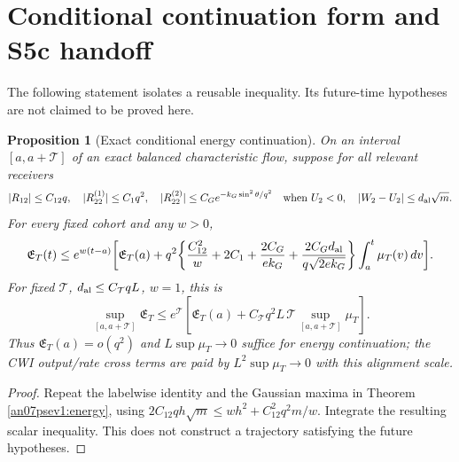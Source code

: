 \documentclass[11pt]{article}
\numberwithin{equation}{section}
\newtheorem{proposition}[theorem]{Proposition}
\theoremstyle{remark}\newtheorem{remark}[theorem]{Remark}
\newcommand{\EE}{\mathfrak E}
\begin{document}
\section{Conditional continuation form and S5c handoff}
\label{an07psev1:continuation}
The following statement isolates a reusable inequality. Its
future-time hypotheses are not claimed to be proved here.
\begin{proposition}[Exact conditional energy continuation]
\label{an07psev1:conditional}
On an interval \([a,a+\mathcal T]\) of an exact balanced characteristic
flow, suppose for all relevant receivers
\[
 |R_{12}|\le C_{12}q,\quad |R_{22}^{(1)}|\le C_1q^2,\quad
 |R_{22}^{(2)}|\le C_Ge^{-k_G\sin^2\theta/q^2}
                         \quad\text{when }U_2<0,
 \quad |W_2-U_2|\le d_{\rm al}\sqrt m .
 \]
For every fixed cohort and any \(w>0\),
\begin{align}
 \EE_T(t)\le e^{w(t-a)}\bigg[\EE_T(a)
 +q^2\bigg\{\frac{C_{12}^2}{w}+2C_1
 +\frac{2C_G}{e k_G}
 +\frac{2C_Gd_{\rm al}}{q\sqrt{2e k_G}}\bigg\}
 \int_a^t\mu_T(v)\dd v\bigg].
 \label{an07psev1:conditionalbound}
\end{align}
For fixed \(\mathcal T\), \(d_{\rm al}\le C_{\mathcal T}qL\),
\(w=1\), this is
\[
 \sup_{[a,a+\mathcal T]}\EE_T
 \le e^{\mathcal T}[\EE_T(a)+C_{\mathcal T}q^2L\,\mathcal T
                         \sup_{[a,a+\mathcal T]}\mu_T].
 \]
Thus \(\EE_T(a)=o(q^2)\) and
\(L\sup\mu_T\to0\) suffice for energy continuation;
the CWI output/rate cross terms are paid by
\(L^2\sup\mu_T\to0\) with this alignment scale.
\end{proposition}
\begin{proof}
Repeat the labelwise identity and the Gaussian maxima in
Theorem \ref{an07psev1:energy}, using
\(2C_{12}qh\sqrt m\le wh^2+C_{12}^2q^2m/w\).
Integrate the resulting scalar inequality. This does not
construct a trajectory satisfying the future hypotheses.
\end{proof}
\end{document}
